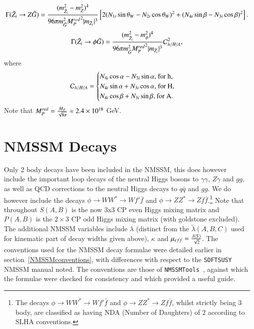 \documentclass[final,3p,times]{elsarticle}
\begin{document}
\begin{equation} \label{neutZgrav}
\Gamma(\tilde{Z}_i \rightarrow Z \tilde{G}) = {(m_{\tilde{Z}_i}^2 - m_{Z}^2)^4 \over 96 \pi m_{\tilde{G}}^2 {M_{P}^{red}}^2 |m_{\tilde{Z}_i}|^3}\left[2(N_{1i}\sin\theta_W - N_{2i}\cos\theta_W)^2 + (N_{4i}\sin\beta-N_{3i}\cos\beta)^2\right].
\end{equation}
\begin{equation} \label{neutphigrav}
\Gamma(\tilde{Z}_i \rightarrow \phi \tilde{G}) = {(m_{\tilde{Z}_i}^2 - m_{\phi}^2)^4 \over 96 \pi m_{\tilde{G}}^2 {M_{P}^{red}}^2 |m_{\tilde{Z}_i}|^3}\mathcal{C}_{h/H/A}^2,
\end{equation}
where
\begin{equation}
\mathcal{C}_{h/H/A} = \begin{cases} N_{4i}\cos\alpha - N_{3i}\sin\alpha $, for h, $ \\
									N_{4i}\sin\alpha + N_{3i}\cos\alpha $, for H, $ \\
									N_{4i}\cos\beta + N_{3i} \sin\beta $, for A. $
						\end{cases}
\end{equation}
Note that $M_{P}^{red} = {M_{P} \over \sqrt{8\pi}} \approx 2.4 \times 10^{18} $ GeV.

\section{NMSSM Decays} \label{appendix:NMSSMdec}
Only 2 body decays have been included in the NMSSM, this does however include
the important loop decays of the neutral Higgs bosons to $\gamma\gamma$,
$Z\gamma$ and $gg$, as well as QCD corrections to the neutral Higgs decays to
$q\bar{q}$ and $gg$. We do however include the decays $\phi \rightarrow WW^*
\rightarrow Wf'\bar{f}$ and $\phi \rightarrow ZZ^* \rightarrow
Zf\bar{f}$.\footnote{The decays $\phi \rightarrow WW^* \rightarrow Wf'\bar{f}$
  and $\phi \rightarrow ZZ^* \rightarrow Zf\bar{f}$, whilst strictly being 3
  body, are classified as having NDA (Number of Daughters) of 2 according to
  SLHA conventions.} 
Note that throughout $S(A,B)$ is the now 3x3 CP even Higgs mixing matrix and $P(A,B)$ is the  $2\times3$ CP odd Higgs mixing matrix (with goldstone excluded). The additional NMSSM variables include $\lambda$ (distinct from the $\tilde{\lambda}(A,B,C)$ used for kinematic part of decay widths given above), $\kappa$ and $\mu_{eff} = {\lambda \langle S \rangle \over \sqrt{2}}$. The conventions used for the NMSSM decay formulae were detailed earlier in section~\ref{NMSSMconventions}, with differences with respect to the {\tt SOFTSUSY} NMSSM manual \cite{Allanach:2013kza} noted. The conventions are those of {\tt NMSSMTools}~\cite{Ellwanger:2004xm,Ellwanger:2006rn,Ellwanger:2012dd,Ellwanger:2006ch}, against which the formulae were checked for consistency and which provided a useful guide.
\end{document}
